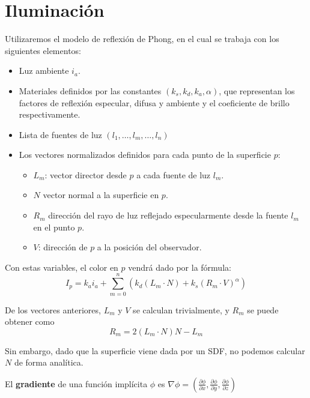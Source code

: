 \section{Iluminación}
Utilizaremos el modelo de reflexión de Phong, en el cual se trabaja con los siguientes elementos:
\begin{itemize}
    \item Luz ambiente $i_a$.
    \item Materiales definidos por las constantes $(k_s, k_d, k_a, \alpha)$, que representan los factores de reflexión especular, difusa y ambiente y el coeficiente de brillo respectivamente.
    \item Lista de fuentes de luz $(l_1, \dots, l_m, \dots, l_n)$
    \item Los vectores normalizados definidos para cada punto de la superficie $p$:
          \begin{itemize}
              \item $L_m$: vector director desde $p$ a cada fuente de luz $l_m$.
              \item $N$ vector normal a la superficie en $p$.
              \item $R_m$ dirección del rayo de luz reflejado especularmente desde la fuente $l_m$ en el punto $p$.
              \item $V$: dirección de $p$ a la posición del observador.
          \end{itemize}
\end{itemize}

Con estas variables, el color en $p$ vendrá dado por la fórmula:
\begin{equation*}
    I_p = k_a i_a + \sum_{m=0}^{n} \left(k_d\left(L_m\cdot N\right) + k_s\left(R_m\cdot V\right)^{\alpha} \right)
\end{equation*}

De los vectores anteriores, $L_m$ y $V$ se calculan trivialmente, y $R_m$ se puede obtener como
\begin{equation*}
    R_m = 2(L_m\cdot N)N - L_m
\end{equation*}

Sin embargo, dado que la superficie viene dada por un SDF, no podemos calcular $N$ de forma analítica.

\begin{definicion}
    El \textbf{gradiente} de una función implícita $\phi$ es $\nabla\phi = \left(\frac{\partial \phi}{\partial x}, \frac{\partial \phi}{\partial y}, \frac{\partial \phi}{\partial z}\right)$
\end{definicion}

